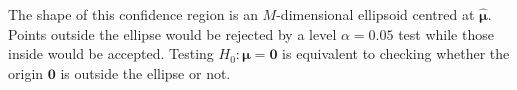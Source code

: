 \documentclass[letterpaper,12pt,oneside,final]{article}
\newcommand{\ve}[1]{\mathbf{#1}}           %
\newcommand{\sv}[1]{\boldsymbol{#1}}   %
\begin{document}
The shape of this confidence region is an $M$-dimensional ellipsoid centred at $\widehat{\sv{\mu}}$. Points outside the ellipse would be rejected by a level $\alpha = 0.05$ test while those inside would be accepted. Testing $H_0: \sv{\mu} = \ve{0}$ is equivalent to checking whether the origin $\ve{0}$ is outside the ellipse or not. %

\end{document}
